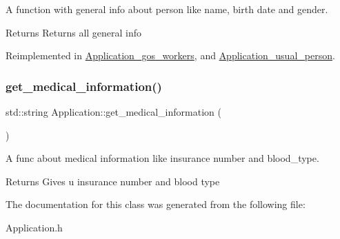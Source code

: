 A function with general info about person like name, birth date and gender. 

\begin{DoxyReturn}{Returns}
Returns all general info 
\end{DoxyReturn}


Reimplemented in \mbox{\hyperlink{classApplication__gos__workers_ab9600d95a2de52c0b25a5f29c9da5cd5}{Application\+\_\+gos\+\_\+workers}}, and \mbox{\hyperlink{classApplication__usual__person_a6ea5c42c57eb422761d4b208eb8ffaca}{Application\+\_\+usual\+\_\+person}}.

\mbox{\label{classApplication_ade6d895ba440d17e12b21baf93bc8312}} 
\subsubsection{\texorpdfstring{get\+\_\+medical\+\_\+information()}{get\_medical\_information()}}
{\footnotesize\ttfamily std\+::string Application\+::get\+\_\+medical\+\_\+information (\begin{DoxyParamCaption}{ }\end{DoxyParamCaption})\hspace{0.3cm}{\ttfamily [inline]}}



A func about medical information like insurance number and blood\+\_\+type. 

\begin{DoxyReturn}{Returns}
Gives u insurance number and blood type 
\end{DoxyReturn}


The documentation for this class was generated from the following file\+:\begin{DoxyCompactItemize}
\item 
Application.\+h\end{DoxyCompactItemize}
